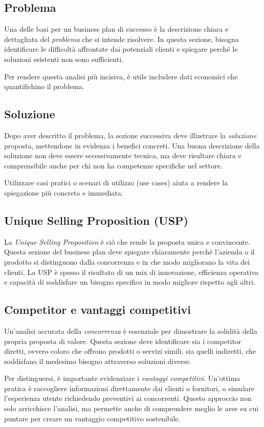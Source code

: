 \subsection*{Problema}
Una delle basi per un business plan di successo è la descrizione chiara e dettagliata del \textit{problema} che si intende risolvere. In questa sezione, bisogna identificare le difficoltà affrontate dai potenziali clienti e spiegare perché le soluzioni esistenti non sono sufficienti. 

Per rendere questa analisi più incisiva, è utile includere dati economici che quantifichino il problema. 

\subsection*{Soluzione}
Dopo aver descritto il problema, la sezione successiva deve illustrare la \textit{soluzione} proposta, mettendone in evidenza i benefici concreti. Una buona descrizione della soluzione non deve essere eccessivamente tecnica, ma deve risultare chiara e comprensibile anche per chi non ha competenze specifiche nel settore.

Utilizzare casi pratici o scenari di utilizzo (use cases) aiuta a rendere la spiegazione più concreta e immediata.

\subsection*{Unique Selling Proposition (USP)}
La \textit{Unique Selling Proposition} è ciò che rende la proposta unica e convincente. Questa sezione del business plan deve spiegare chiaramente perché l’azienda o il prodotto si distinguono dalla concorrenza e in che modo migliorano la vita dei clienti. La USP è spesso il risultato di un mix di innovazione, efficienza operativa e capacità di soddisfare un bisogno specifico in modo migliore rispetto agli altri.

\subsection*{Competitor e vantaggi competitivi}
Un’analisi accurata della \textit{concorrenza} è essenziale per dimostrare la solidità della propria proposta di valore. Questa sezione deve identificare sia i competitor diretti, ovvero coloro che offrono prodotti o servizi simili, sia quelli indiretti, che soddisfano il medesimo bisogno attraverso soluzioni diverse.

Per distinguersi, è importante evidenziare i \textit{vantaggi competitivi}. 
Un’ottima pratica è raccogliere informazioni direttamente dai clienti o fornitori, o simulare l’esperienza utente richiedendo preventivi ai concorrenti. Questo approccio non solo arricchisce l’analisi, ma permette anche di comprendere meglio le aree su cui puntare per creare un vantaggio competitivo sostenibile.

